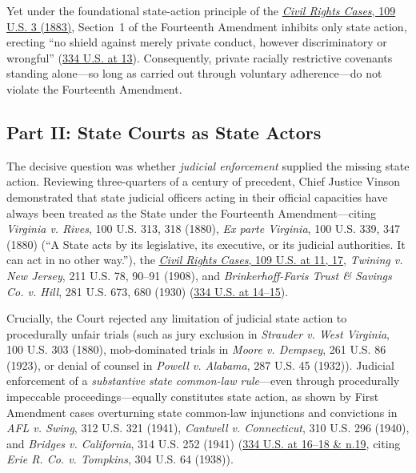 \documentclass[12pt]{article}
\begin{document}
Yet under the foundational state-action principle of the \href{https://supreme.justia.com/cases/federal/us/109/3/}{\textit{Civil Rights Cases}, 109 U.S. 3 (1883)}, Section~1 of the Fourteenth Amendment inhibits only state action, erecting ``no shield against merely private conduct, however discriminatory or wrongful'' (\href{https://supreme.justia.com/cases/federal/us/334/1/}{334 U.S. at 13}). Consequently, private racially restrictive covenants standing alone---so long as carried out through voluntary adherence---do not violate the Fourteenth Amendment.

\subsection{Part II: State Courts as State Actors}
The decisive question was whether \textit{judicial enforcement} supplied the missing state action. Reviewing three-quarters of a century of precedent, Chief Justice Vinson demonstrated that state judicial officers acting in their official capacities have always been treated as the State under the Fourteenth Amendment---citing \textit{Virginia v. Rives}, 100 U.S. 313, 318 (1880), \textit{Ex parte Virginia}, 100 U.S. 339, 347 (1880) (``A State acts by its legislative, its executive, or its judicial authorities. It can act in no other way.''), the \href{https://supreme.justia.com/cases/federal/us/109/3/}{\textit{Civil Rights Cases}, 109 U.S. at 11, 17}, \textit{Twining v. New Jersey}, 211 U.S. 78, 90--91 (1908), and \textit{Brinkerhoff-Faris Trust \& Savings Co. v. Hill}, 281 U.S. 673, 680 (1930) (\href{https://supreme.justia.com/cases/federal/us/334/1/}{334 U.S. at 14--15}).

Crucially, the Court rejected any limitation of judicial state action to procedurally unfair trials (such as jury exclusion in \textit{Strauder v. West Virginia}, 100 U.S. 303 (1880), mob-dominated trials in \textit{Moore v. Dempsey}, 261 U.S. 86 (1923), or denial of counsel in \textit{Powell v. Alabama}, 287 U.S. 45 (1932)). Judicial enforcement of a \textit{substantive state common-law rule}---even through procedurally impeccable proceedings---equally constitutes state action, as shown by First Amendment cases overturning state common-law injunctions and convictions in \textit{AFL v. Swing}, 312 U.S. 321 (1941), \textit{Cantwell v. Connecticut}, 310 U.S. 296 (1940), and \textit{Bridges v. California}, 314 U.S. 252 (1941) (\href{https://supreme.justia.com/cases/federal/us/334/1/}{334 U.S. at 16--18 \& n.19}, citing \textit{Erie R. Co. v. Tompkins}, 304 U.S. 64 (1938)).
\end{document}
